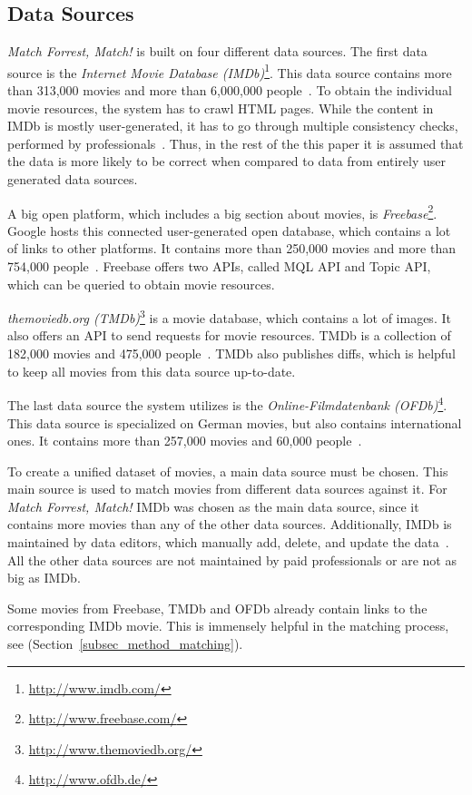 \subsection{Data Sources}
\label{subsec_method_datasources}

\emph{Match Forrest, Match!} is built on four different data sources.
The first data source is the \textit{Internet Movie Database (IMDb)}\footnote{\url{http://www.imdb.com/}}.
This data source contains more than 313,000 movies and more than 6,000,000 people~\cite{IMDb_stats}.
To obtain the individual movie resources, the system has to crawl HTML pages.
While the content in IMDb is mostly user-generated, it has to go through multiple consistency checks, performed by professionals~\cite{IMDb_DataCreation, IMDb_amazon}.
Thus, in the rest of the this paper it is assumed that the data is more likely to be correct when compared to data from entirely user generated data sources.

A big open platform, which includes a big section about movies, is \textit{Freebase}\footnote{\url{http://www.freebase.com/}}.
Google hosts this connected user-generated open database, which contains a lot of links to other platforms.
It contains more than 250,000 movies and more than 754,000 people~\cite{Freebase_stats}.
Freebase offers two APIs, called MQL API and Topic API, which can be queried to obtain movie resources.

\textit{themoviedb.org (TMDb)}\footnote{\url{http://www.themoviedb.org/}} is a movie database, which contains a lot of images.
It also offers an API to send requests for movie resources.
TMDb is a collection of 182,000 movies and 475,000 people~\cite{TMDb_stats}.
TMDb also publishes diffs, which is helpful to keep all movies from this data source up-to-date.

The last data source the system utilizes is the \textit{Online-Filmdatenbank (OFDb)}\footnote{\url{http://www.ofdb.de/}}.
This data source is specialized on German movies, but also contains international ones.
It contains more than 257,000 movies and 60,000 people~\cite{OFDb_stats}.

To create a unified dataset of movies, a main data source must be chosen.
This main source is used to match movies from different data sources against it.
For \emph{Match Forrest, Match!} IMDb was chosen as the main data source, since it contains more movies than any of the other data sources.
Additionally, IMDb is maintained by data editors, which manually add, delete, and update the data~\cite{IMDb_DataCreation, IMDb_amazon}.
All the other data sources are not maintained by paid professionals or are not as big as IMDb.

Some movies from Freebase, TMDb and OFDb already contain links to the corresponding IMDb movie.
This is immensely helpful in the matching process, see (Section~\ref{subsec_method_matching}).